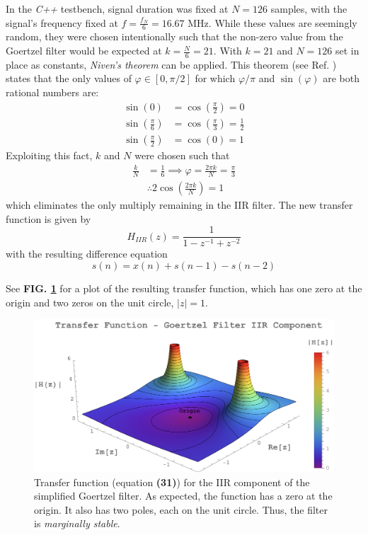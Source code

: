 \documentclass[reprint,amsmath,amssymb,aps,pra]{revtex4-2}
\begin{document}
In the \textit{C++} testbench, signal duration was fixed at $N = 126$ samples, with the signal's frequency fixed at $f = \frac{f_N}{6} = 16.67$ MHz. While these values are seemingly random, they were chosen intentionally such that the non-zero value from the Goertzel filter would be expected at $k = \frac{N}{6} = 21$. With $k = 21$ and $N = 126$ set in place as constants, \textit{Niven's theorem} can be applied. This theorem (see Ref. \cite{niven}) states that the only values of $\varphi \in [0,\pi/2]$ for which $\varphi/\pi$ and  $\sin(\varphi)$ are both rational numbers are:
\begin{align}
    \sin(0) & = \cos(\frac{\pi}{2}) = 0 \nonumber \\
    \sin(\frac{\pi}{6}) & = \cos(\frac{\pi}{3}) = \frac{1}{2} \\
    \sin(\frac{\pi}{2}) & = \cos(0) = 1 \nonumber
\end{align}
Exploiting this fact, $k$ and $N$ were chosen such that
\begin{align}
    \frac{k}{N} & = \frac{1}{6}  \implies \varphi = \frac{2\pi k}{N} = \frac{\pi}{3} \nonumber \\ 
    & \therefore 2\cos(\frac{2\pi k}{N}) = 1
\end{align}
which eliminates the only multiply remaining in the IIR filter. The new transfer function is given by
\begin{equation}
    H_{IIR}(z) = \frac{1}{1 - z^{-1} + z^{-2}}
\end{equation}
with the resulting difference equation
\begin{equation}
    s(n) = x(n) + s(n-1) - s(n-2)
\end{equation}

See \textbf{FIG. \ref{fig:transfunc}} for a plot of the resulting transfer function, which has one zero at the origin and two zeros on the unit circle, $|z| = 1$.

\begin{figure}
    \centering
    \includegraphics[width=\linewidth]{figs/transfer_function_w_bar.png}
    \caption{Transfer function (equation \textbf{(31)}) for the IIR component of the simplified Goertzel filter. As expected, the function has a zero at the origin. It also has two poles, each on the unit circle. Thus, the filter is \textit{marginally stable}.}
    \label{fig:transfunc}
\end{figure}
\end{document}
